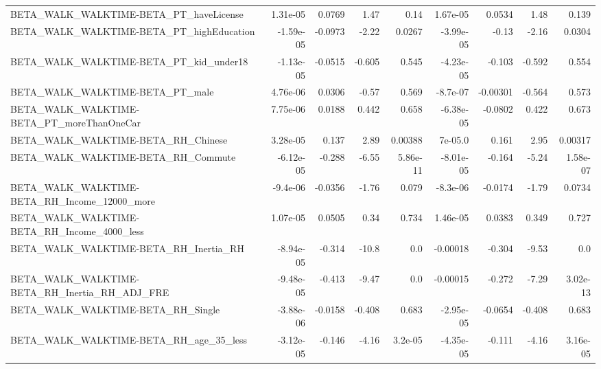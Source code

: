 \begin{tabular}{lrrrrrrrr}
BETA\_WALK\_WALKTIME-BETA\_PT\_haveLicense             &    1.31e-05 &       0.0769 &     1.47 &     0.14 &   1.67e-05 &      0.0534 &         1.48 &         0.139 \\
BETA\_WALK\_WALKTIME-BETA\_PT\_highEducation           &   -1.59e-05 &      -0.0973 &    -2.22 &   0.0267 &  -3.99e-05 &       -0.13 &        -2.16 &        0.0304 \\
BETA\_WALK\_WALKTIME-BETA\_PT\_kid\_under18             &   -1.13e-05 &      -0.0515 &   -0.605 &    0.545 &  -4.23e-05 &      -0.103 &       -0.592 &         0.554 \\
BETA\_WALK\_WALKTIME-BETA\_PT\_male                    &    4.76e-06 &       0.0306 &    -0.57 &    0.569 &   -8.7e-07 &    -0.00301 &       -0.564 &         0.573 \\
BETA\_WALK\_WALKTIME-BETA\_PT\_moreThanOneCar          &    7.75e-06 &       0.0188 &    0.442 &    0.658 &  -6.38e-05 &     -0.0802 &        0.422 &         0.673 \\
BETA\_WALK\_WALKTIME-BETA\_RH\_Chinese                 &    3.28e-05 &        0.137 &     2.89 &  0.00388 &    7e-05.0 &       0.161 &         2.95 &       0.00317 \\
BETA\_WALK\_WALKTIME-BETA\_RH\_Commute                 &   -6.12e-05 &       -0.288 &    -6.55 & 5.86e-11 &  -8.01e-05 &      -0.164 &        -5.24 &      1.58e-07 \\
BETA\_WALK\_WALKTIME-BETA\_RH\_Income\_12000\_more       &    -9.4e-06 &      -0.0356 &    -1.76 &    0.079 &   -8.3e-06 &     -0.0174 &        -1.79 &        0.0734 \\
BETA\_WALK\_WALKTIME-BETA\_RH\_Income\_4000\_less        &    1.07e-05 &       0.0505 &     0.34 &    0.734 &   1.46e-05 &      0.0383 &        0.349 &         0.727 \\
BETA\_WALK\_WALKTIME-BETA\_RH\_Inertia\_RH              &   -8.94e-05 &       -0.314 &    -10.8 &      0.0 &   -0.00018 &      -0.304 &        -9.53 &           0.0 \\
BETA\_WALK\_WALKTIME-BETA\_RH\_Inertia\_RH\_ADJ\_FRE      &   -9.48e-05 &       -0.413 &    -9.47 &      0.0 &   -0.00015 &      -0.272 &        -7.29 &      3.02e-13 \\
BETA\_WALK\_WALKTIME-BETA\_RH\_Single                  &   -3.88e-06 &      -0.0158 &   -0.408 &    0.683 &  -2.95e-05 &     -0.0654 &       -0.408 &         0.683 \\
BETA\_WALK\_WALKTIME-BETA\_RH\_age\_35\_less             &   -3.12e-05 &       -0.146 &    -4.16 &  3.2e-05 &  -4.35e-05 &      -0.111 &        -4.16 &      3.16e-05 \\

\end{tabular}
